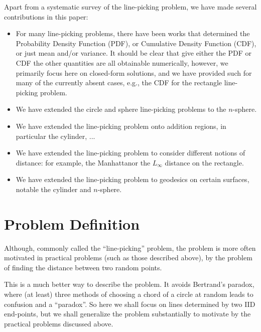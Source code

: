 \documentclass{article}
\begin{document}
Apart from a systematic survey of the line-picking problem, we have
made several contributions in this paper:
\begin{itemize}

\item For many line-picking problems, there have been works that
  determined the Probability Density Function (PDF), or Cumulative
  Density Function (CDF), or just mean and/or variance. It should be
  clear that give either the PDF or CDF the other quantities are all
  obtainable numerically, however, we primarily focus here on
  closed-form solutions, and we have provided such for many of the
  currently absent cases, e.g., the CDF for the rectangle line-picking
  problem. 

\item We have extended the circle and sphere line-picking problems to
  the $n$-sphere.

\item We have extended the line-picking problem onto addition regions,
  in particular the cylinder, ...

\item We have extended the line-picking problem to consider different
  notions of distance: for example, the Manhattanor the $L_{\infty}$
  distance on the rectangle.

\item We have extended the line-picking problem to geodesics on
  certain surfaces, notable the cylinder and $n$-sphere.

\end{itemize}



\section{Problem Definition}

Although, commonly called the ``line-picking'' problem, the problem is
more often motivated in practical problems (such as those described
above), by the problem of finding the distance between two random
points. 

This is a much better way to describe the problem. It avoids
Bertrand's paradox, where (at least) three methods of choosing a chord
of a circle at random leads to confusion and a ``paradox''.
So here we shall focus on lines determined by two IID end-points, but
we shall generalize the problem substantially to motivate by the
practical problems discussed above.
\end{document}
